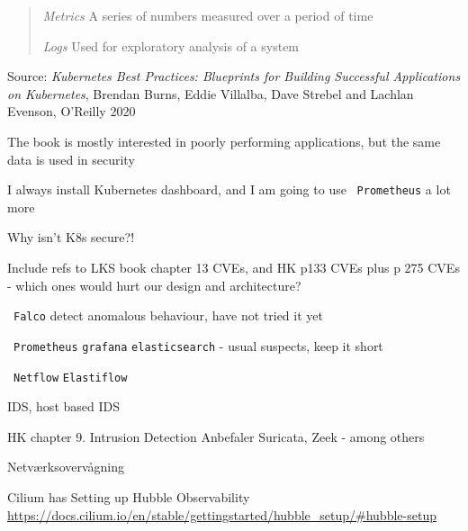\documentclass[Screen16to9,17pt]{foils}
\begin{document}

\begin{quote}
\emph{Metrics} A series of numbers measured over a period of time

\emph{Logs} Used for exploratory analysis of a system
\end{quote}
Source: \emph{Kubernetes Best Practices: Blueprints for Building Successful Applications on Kubernetes}, Brendan Burns, Eddie Villalba, Dave Strebel and Lachlan Evenson, O'Reilly 2020

\begin{list2}
\item The book is mostly interested in poorly performing applications, but the same data is used in security
\item I always install Kubernetes dashboard, and I am going to use \faWrench\ \verb+Prometheus+ a lot more
\end{list2}


Why isn't K8s secure?!
\begin{list2}
\item Include refs to LKS book chapter 13 CVEs, and HK p133 CVEs plus p 275 CVEs
- which ones would hurt our design and architecture?
\end{list2}


\begin{list2}
\item \faWrench\ \verb+Falco+ detect anomalous behaviour, have not tried it yet
\item \faWrench\ \verb+Prometheus+ \verb+grafana+ \verb+elasticsearch+ - usual suspects, keep it short
\item \faWrench\ \verb+Netflow+ \verb+Elastiflow+
\end{list2}


\begin{list2}
\item IDS, host based IDS
\item HK chapter 9. Intrusion Detection
Anbefaler Suricata, Zeek - among others
\end{list2}



\begin{list2}
\item Netværksovervågning
\item Cilium has Setting up Hubble Observability \\
\url{https://docs.cilium.io/en/stable/gettingstarted/hubble_setup/#hubble-setup}
\end{list2}
\end{document}
